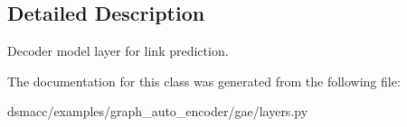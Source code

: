\subsection{Detailed Description}
\begin{DoxyVerb}Decoder model layer for link prediction.\end{DoxyVerb}
 

The documentation for this class was generated from the following file\+:\begin{DoxyCompactItemize}
\item 
dsmacc/examples/graph\+\_\+auto\+\_\+encoder/gae/layers.\+py\end{DoxyCompactItemize}
